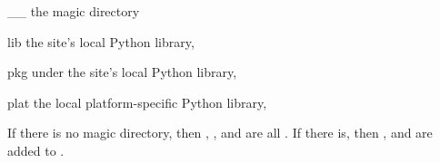 \begin{memberdesc}[string]{__}
the magic directory
\end{memberdesc}

\begin{memberdesc}[string]{lib}
the site's local Python library, 
\end{memberdesc}

\begin{memberdesc}[string]{pkg}
 under the site's local Python library,
\end{memberdesc}

\begin{memberdesc}[string]{plat}
the local platform-specific Python library, 
\end{memberdesc}

If there is no magic directory, then \code{__}, ,  and
 are all . If there is, then ,  and
 are added to .
